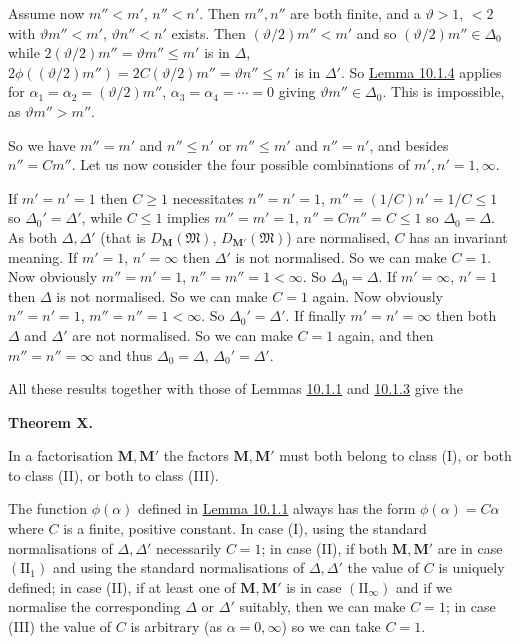\documentclass[12pt,b5paper,twoside]{article}
\newcommand{\M}{\mathbf M}
\newcommand{\MainTheorem}[1]{%
  \par\smallskip\noindent\phantomsection\label{thm:#1}\textbf{Theorem #1.}\enspace
}
\newcommand{\lemref}[1]{\hyperref[lem:#1]{Lemma #1}}
\begin{document}
Assume now $m''<m'$, $n''<n'$. Then $m'',n''$ are both finite, and a
$\vartheta>1$, $<2$ with $\vartheta m''<m'$,
$\vartheta n''<n'$ exists. Then $(\vartheta/2)m''<m'$ and so
$(\vartheta/2)m''\in\Delta_0$ while $2(\vartheta/2)m''=\vartheta m''\leq m'$ is in
$\Delta$, $2\phi((\vartheta/2)m'')=2C(\vartheta/2)m''
=\vartheta n''\leq n'$ is in $\Delta'$. So \lemref{10.1.4} applies for
$\alpha_1=\alpha_2=(\vartheta/2)m''$,
$\alpha_3=\alpha_4=\cdots=0$ giving $\vartheta m''\in\Delta_0$. This is
impossible, as $\vartheta m''>m''$.

So we have $m''=m'$ and $n''\leq n'$ or $m''\leq m'$ and $n''=n'$, and
besides $n''=Cm''$. Let us now consider the four possible combinations of
$m',n'=1,\infty$.

If $m'=n'=1$ then $C\geq1$ necessitates $n''=n'=1$,
$m''=(1/C)n'=1/C\leq1$ so $\Delta_0'=\Delta'$, while $C\leq1$ implies
$m''=m'=1$, $n''=Cm''=C\leq1$ so $\Delta_0=\Delta$. As both
$\Delta,\Delta'$ (that is $D_{\M}(\mathfrak M)$,
$D_{\M'}(\mathfrak M)$) are normalised, $C$ has an invariant meaning.
If $m'=1$, $n'=\infty$ then $\Delta'$ is not normalised. So we can make
$C=1$. Now obviously $m''=m'=1$, $n''=m''=1<\infty$. So
$\Delta_0=\Delta$. If $m'=\infty$, $n'=1$ then $\Delta$ is not
normalised. So we can make $C=1$ again. Now obviously
$n''=n'=1$, $m''=n''=1<\infty$. So $\Delta_0'=\Delta'$. If finally
$m'=n'=\infty$ then both $\Delta$ and $\Delta'$ are not normalised. So we
can make $C=1$ again, and then $m''=n''=\infty$ and thus
$\Delta_0=\Delta$, $\Delta_0'=\Delta'$.

All these results together with those of Lemmas
\hyperref[lem:10.1.1]{10.1.1} and \hyperref[lem:10.1.3]{10.1.3} give the

\MainTheorem{X}
In a factorisation $\M,\M'$ the factors $\M,\M'$ must both belong to class
(I), or both to class (II), or both to class (III).

The function $\phi(\alpha)$ defined in \lemref{10.1.1} always has the form
$\phi(\alpha)=C\alpha$ where $C$ is a finite, positive constant. In case
(I), using the standard normalisations of $\Delta,\Delta'$ necessarily
$C=1$; in case (II), if both $\M,\M'$ are in case $(\mathrm{II}_1)$ and
using the standard normalisations of $\Delta,\Delta'$ the value of $C$ is
uniquely defined; in case (II), if at least one of $\M,\M'$ is in case
$(\mathrm{II}_\infty)$ and if we normalise the corresponding $\Delta$ or
$\Delta'$ suitably, then we can make $C=1$; in case (III) the value of $C$
is arbitrary (as $\alpha=0,\infty$) so we can take $C=1$.
\end{document}
